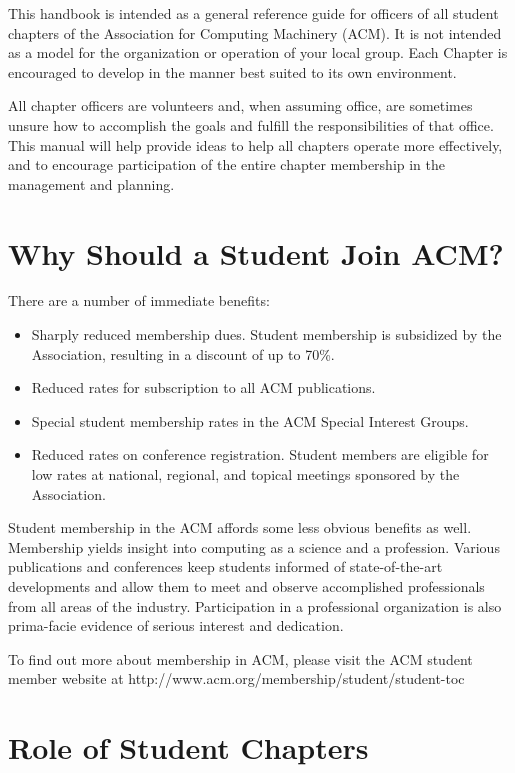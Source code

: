 This handbook is intended as a general reference guide for officers of all
student chapters of the Association for Computing Machinery (ACM). It is not
intended as a model for the organization or operation of your local group.
Each Chapter is encouraged to develop in the manner best suited to its own
environment.

All chapter officers are volunteers and, when assuming office, are sometimes
unsure how to accomplish the goals and fulfill the responsibilities of that
office. This manual will help provide ideas to help all chapters operate more
effectively, and to encourage participation of the entire chapter membership in
the management and planning.

\section{Why Should a Student Join ACM?}
\label{sec:sec03}

There are a number of immediate benefits:
	\begin{itemize}
		\item Sharply reduced membership dues. Student membership is subsidized by
					the Association, resulting in a discount of up to 70\%.
      \item Reduced rates for subscription to all ACM publications.
		\item Special student membership rates in the ACM Special Interest Groups.
		\item Reduced rates on conference registration. Student members are eligible
					for low rates at national, regional, and topical meetings sponsored by
					the Association.
	\end{itemize}

Student membership in the ACM affords some less obvious benefits as well.
Membership yields insight into computing as a science and a profession.
Various publications and conferences keep students informed of state-of-the-art
developments and allow them to meet and observe accomplished professionals from
all areas of the industry. Participation in a professional organization is also
prima-facie evidence of serious interest and dedication.

To find out more about membership in ACM, please visit the ACM student member
website at http://www.acm.org/membership/student/student-toc

\section{Role of Student Chapters}
\label{sec:sec04}

